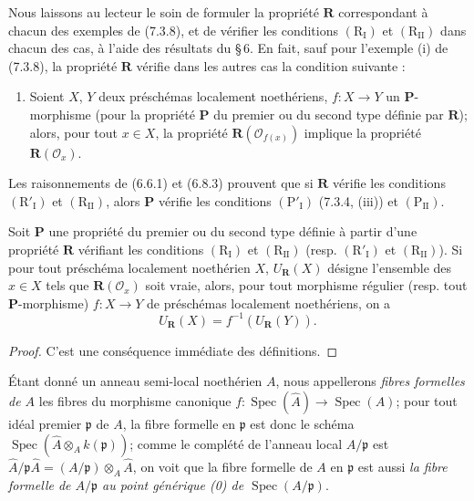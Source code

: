 \begin{remark}[7.3.11]
\label{IV.2.s7.3.11-fr}
Nous laissons au lecteur le soin de formuler la propriété $\boldsymbol R$
correspondant à chacun des exemples de (7.3.8), et de vérifier les
conditions $(\mathrm R_{\mathrm I})$ et $(\mathrm R_{\mathrm{II}})$ dans
chacun des cas, à l'aide des résultats du \S\,6. En fait, sauf pour
l'exemple (i) de (7.3.8), la propriété $\boldsymbol R$ vérifie dans les
autres cas la condition suivante :
\begin{enumerate}
\item[$(\mathrm R'_{\mathrm I})$] Soient $X$, $Y$ deux préschémas
localement noethériens, $f:X\to Y$ un $\boldsymbol P$-morphisme (pour la
propriété $\boldsymbol P$ du premier ou du second type définie par
$\boldsymbol R$); alors, pour tout $x\in X$, la propriété
$\boldsymbol R(\mathscr O_{f(x)})$ implique la propriété
$\boldsymbol R(\mathscr O_x)$.
\end{enumerate}
Les raisonnements de (6.6.1) et (6.8.3) prouvent que si
$\boldsymbol R$ vérifie les conditions $(\mathrm R'_{\mathrm I})$ et
$(\mathrm R_{\mathrm{II}})$, alors $\boldsymbol P$ vérifie les conditions
$(\mathrm P'_{\mathrm I})$ (7.3.4, (iii)) et
$(\mathrm P_{\mathrm{II}})$.
\end{remark}

\begin{proposition}[7.3.12]
\label{IV.2.s7.3.12-fr}
Soit $\boldsymbol P$ une propriété du premier ou du second type définie à
partir d'une propriété $\boldsymbol R$ vérifiant les conditions
$(\mathrm R_{\mathrm I})$ et $(\mathrm R_{\mathrm{II}})$ (resp.
$(\mathrm R'_{\mathrm I})$ et $(\mathrm R_{\mathrm{II}})$). Si pour tout
préschéma localement noethérien $X$, $U_{\boldsymbol R}(X)$ désigne
l'ensemble des $x\in X$ tels que $\boldsymbol R(\mathscr O_x)$ soit vraie,
alors, pour tout morphisme régulier (resp. tout
$\boldsymbol P$-morphisme) $f:X\to Y$ de préschémas localement
noethériens, on a
\begin{equation}
U_{\boldsymbol R}(X)=f^{-1}(U_{\boldsymbol R}(Y)).
\tag{7.3.12.1}
\label{IV.2.eq.7.3.12.1-fr}
\end{equation}
\end{proposition}

\begin{proof}
C'est une conséquence immédiate des définitions.
\end{proof}

\begin{env}[7.3.13]
\label{IV.2.s7.3.13-fr}
Étant donné un anneau semi-local noethérien $A$, nous appellerons
\emph{fibres formelles de $A$} les fibres du morphisme canonique
$f:\operatorname{Spec}(\widehat A)\to\operatorname{Spec}(A)$; pour tout
idéal premier $\mathfrak p$ de $A$, la fibre formelle en $\mathfrak p$ est
donc le schéma
$\operatorname{Spec}(\widehat A\otimes_A k(\mathfrak p))$; comme le
complété de l'anneau local $A/\mathfrak p$ est
$\widehat A/\mathfrak p\widehat A=(A/\mathfrak p)\otimes_A\widehat A$, on
voit que la fibre formelle de $A$ en $\mathfrak p$ est aussi \emph{la
fibre formelle de $A/\mathfrak p$ au point générique (0) de
$\operatorname{Spec}(A/\mathfrak p)$}.
\end{env}

